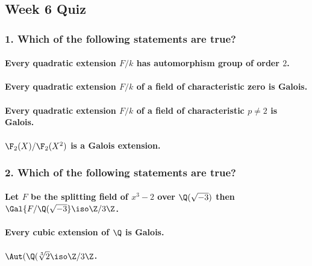 \subsection[Quiz]{Week 6 Quiz}

\subsubsection*{1. Which of the following statements are true?}

\paragraph*{Every quadratic extension $F / k$ has automorphism group of order $2$.}

\paragraph*{Every quadratic extension $F / k$ of a field of characteristic zero is Galois.}

\paragraph*{Every quadratic extension $F / k$ of a field of characteristic $p \neq 2$ is Galois.}

\paragraph*{$\F_2(X) / \F_2(X^2)$ is a Galois extension.}

\subsubsection*{2. Which of the following statements are true?}

\paragraph*{Let $F$ be the splitting field of $x^3 - 2$ over $\Q(\sqrt{-3})$ then $\Gal{F / \Q(\sqrt{-3}} \iso \Z / 3\Z$.}

\paragraph*{Every cubic extension of $\Q$ is Galois.}

\paragraph*{$\Aut(\Q(\sqrt[3]{2} \iso \Z / 3\Z$.}


